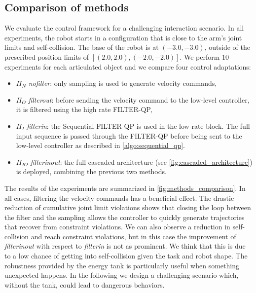 \subsection{Comparison of methods}
We evaluate the control framework for a challenging interaction scenario. In all experiments, the robot starts in a configuration that is close to the arm's joint limits and self-collision. The base of the robot is at $(-3.0, -3.0)$, outside of the prescribed position limits of $[(2.0, 2.0), (-2.0, -2.0)]$. We perform 10 experiments for each articulated object and we compare four control adaptations:
\begin{itemize}
    \item $\Pi_{N}$ \textit{no\textunderscore filter}: only sampling is used to generate velocity commands,
    \item $\Pi_{O}$ \textit{filter\textunderscore out}: before sending the velocity command to the low-level controller, it is filtered using the high rate FILTER-QP,
    \item $\Pi_{I}$ \textit{filter\textunderscore in}: the Sequential FILTER-QP is used in the low-rate block. The full input sequence is passed through the FILTER-QP before being sent to the low-level controller as described in \algo \ref{algo:sequential_qp}.
    \item $\Pi_{IO}$ \textit{filter\textunderscore in\textunderscore out}: the full cascaded architecture (see \fig \ref{fig:cascaded_architecture}) is deployed, combining the previous two methods.
\end{itemize}
The results of the experiments are summarized in \fig \ref{fig:methods_comparison}. In all cases, filtering the velocity commands has a beneficial effect. The drastic reduction of cumulative joint limit violations shows that closing the loop between the filter and the sampling allows the controller to quickly generate trajectories that recover from constraint violations. We can also observe a reduction in self-collision and reach constraint violations, but in this case the improvement of  \textit{filter\textunderscore in\textunderscore out} with respect to \textit{filter\textunderscore in} is not as prominent. We think that this is due to a low chance of getting into self-collision given the task and robot shape. The robustness provided by the energy tank is particularly useful when something unexpected happens. In the following we design a challenging scenario which, without the tank, could lead to dangerous behaviors. 
